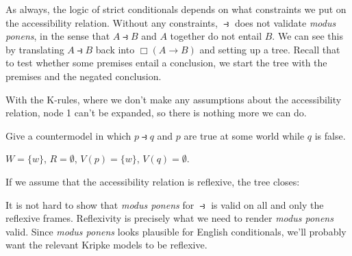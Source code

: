 As always, the logic of strict conditionals depends on what constraints we
put on the accessibility relation. Without any constraints, $\strictif$ does
not validate \emph{modus ponens}, in the sense that $A \strictif B$ and $A$
together do not entail $B$. We can see this by translating
$A \strictif B$ back into $\Box(A \to B)$ and setting up a tree. Recall that to
test whether some premises entail a conclusion, we start the tree with the
premises and the negated conclusion.
%
\begin{center}
\end{center}
%
With the K-rules, where we don't make any assumptions about the accessibility
relation, node 1 can't be expanded, so there is nothing more we can do.

\begin{exercise}
  Give a countermodel in which $p \strictif q$ and $p$ are true at some world
  while $q$ is false.
\end{exercise}
\begin{solution}
  $W = \{ w \}$, $R = \emptyset$, $V(p) = \{ w \} $, $V(q)=\emptyset$.
\end{solution}

If we assume that the accessibility relation is reflexive, the tree closes:
\begin{center}
\end{center}

It is not hard to show that \emph{modus ponens} for $\strictif$ is valid on all
and only the reflexive frames. Reflexivity is precisely what we need to render
\emph{modus ponens} valid. Since \emph{modus ponens} looks plausible for English
conditionals, we'll probably want the relevant Kripke models to be reflexive.


